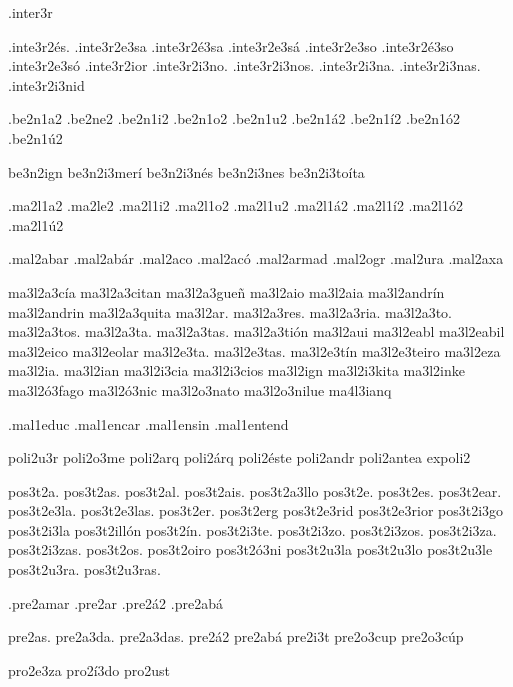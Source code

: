 {{%
.inter3r 

.inte3r2^^e9s. .inte3r2e3sa .inte3r2^^e93sa .inte3r2e3s^^e1 .inte3r2e3so .inte3r2^^e93so .inte3r2e3s^^f3 .inte3r2ior .inte3r2i3no. .inte3r2i3nos. .inte3r2i3na. .inte3r2i3nas. .inte3r2i3nid 

.be2n1a2 .be2ne2 .be2n1i2 .be2n1o2 .be2n1u2 .be2n1^^e12        .be2n1^^ed2 .be2n1^^f32 .be2n1^^fa2 

be3n2ign 
be3n2i3mer^^ed 
be3n2i3n^^e9s 
be3n2i3nes 
be3n2i3to^^edta 

.ma2l1a2 .ma2le2 .ma2l1i2 .ma2l1o2 .ma2l1u2 .ma2l1^^e12        .ma2l1^^ed2 .ma2l1^^f32 .ma2l1^^fa2 

.mal2abar 
.mal2ab^^e1r 
.mal2aco 
.mal2ac^^f3 
.mal2armad 
.mal2ogr 
.mal2ura 
.mal2axa 

ma3l2a3c^^eda 
ma3l2a3citan 
ma3l2a3gue^^f1 
ma3l2aio 
ma3l2aia 
ma3l2andr^^edn 
ma3l2andrin 
ma3l2a3quita 
ma3l2ar. 
ma3l2a3res. 
ma3l2a3ria. 
ma3l2a3to. 
ma3l2a3tos. 
ma3l2a3ta. 
ma3l2a3tas. 
ma3l2a3ti^^f3n 
ma3l2aui 
ma3l2eabl 
ma3l2eabil 
ma3l2eico 
ma3l2eolar 
ma3l2e3ta. 
ma3l2e3tas. 
ma3l2e3t^^edn 
ma3l2e3teiro 
ma3l2eza 
ma3l2ia. 
ma3l2ian 
ma3l2i3cia 
ma3l2i3cios 
ma3l2ign 
ma3l2i3kita 
ma3l2inke 
ma3l2^^f33fago 
ma3l2^^f33nic 
ma3l2o3nato 
ma3l2o3nilue 
ma4l3ianq 

.mal1educ 
.mal1encar 
.mal1ensin 
.mal1entend 


poli2u3r 
poli2o3me 
poli2arq 
poli2^^e1rq 
poli2^^e9ste 
poli2andr 
poli2antea 
expoli2 

pos3t2a. 
pos3t2as. 
pos3t2al. 
pos3t2ais. 
pos3t2a3llo 
pos3t2e. 
pos3t2es. 
pos3t2ear. 
pos3t2e3la. 
pos3t2e3las. 
pos3t2er. 
pos3t2erg 
pos3t2e3rid 
pos3t2e3rior 
pos3t2i3go 
pos3t2i3la 
pos3t2ill^^f3n 
pos3t2^^edn. 
pos3t2i3te. 
pos3t2i3zo. 
pos3t2i3zos. 
pos3t2i3za. 
pos3t2i3zas. 
pos3t2os. 
pos3t2oiro 
pos3t2^^f33ni 
pos3t2u3la 
pos3t2u3lo 
pos3t2u3le 
pos3t2u3ra. 
pos3t2u3ras. 


.pre2amar 
.pre2ar 
.pre2^^e12 
.pre2ab^^e1 

pre2as. 
pre2a3da. 
pre2a3das. 
pre2^^e12 
pre2ab^^e1 
pre2i3t 
pre2o3cup 
pre2o3c^^fap 


pro2e3za 
pro2^^ed3do 
pro2ust 

}}
